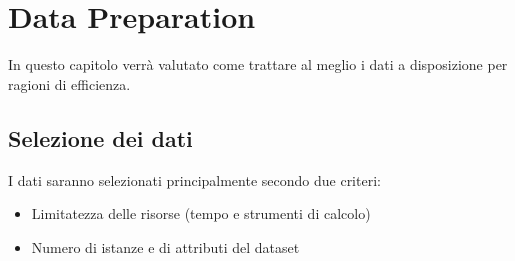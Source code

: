 \chapter{Data Preparation}
\label{ch:datprep}
In questo capitolo verrà valutato come trattare al meglio i dati a disposizione per ragioni di efficienza.

\section{Selezione dei dati}
I dati saranno selezionati principalmente secondo due criteri:
\begin{itemize}
	\item Limitatezza delle risorse (tempo e strumenti di calcolo)
	\item Numero di istanze e di attributi del dataset
\end{itemize}


